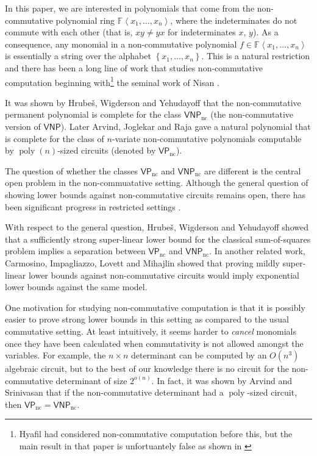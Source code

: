 \documentclass[10pt,a4paper]{article}
\def\Hrubes{Hrube{\v{s}}}
\def\Field{\mathbb{F}}
\let\F\Field
\def\poly{\operatorname{poly}}
\def\set#1{\left\{ #1 \right\}}
\def\inangle#1{\left\langle #1 \right\rangle}
\def\VNP{\mathsf{VNP}}
\def\ncVP{\mathsf{VP}_{\text{nc}}}
\def\ncVNP{\mathsf{VNP}_{\text{nc}}}
\begin{document}
In this paper, we are interested in polynomials that come from the non-commutative polynomial ring $\F \inangle{x_1, \ldots, x_n}$, where the indeterminates do not commute with each other (that is, $xy \neq yx$ for indeterminates $x$, $y$). 
As a consequence, any monomial in a non-commutative polynomial $f \in \F \inangle{x_1, \ldots, x_n}$ is essentially a string over the alphabet $\set{x_1, \ldots, x_n}$. 
This is a natural restriction and there has been a long line of work that studies non-commutative computation beginning with\footnote{Hyafil \cite{H77} had considered non-commutative computation before this, but the main result in that paper is unfortuantely false as shown in \cite{N91}} the seminal work of Nisan \cite{N91}.

It was shown by \Hrubes, Wigderson and Yehudayoff \cite{HWY10} that the non-commutative permanent polynomial is complete for the class $\ncVNP$ (the non-commutative version of $\VNP$).
Later Arvind, Joglekar and Raja \cite{AJR16} gave a natural polynomial that is complete for the class of $n$-variate non-commutative polynomials computable by $\poly(n)$-sized circuits (denoted by $\ncVP$). 

The question of whether the classes $\ncVP$ and $\ncVNP$ are different is the central open problem in the non-commuatative setting. 
Although the general question of showing lower bounds against non-commutative circuits remains open, there has been significant progress in restricted settings \cite{LMS16,LMP19,LLS19,ST18,FLOS20}.

With respect to the general question, \Hrubes, Wigderson and Yehudayoff \cite{HWY11} showed that a sufficiently strong super-linear lower bound for the classical sum-of-squares problem implies a separation between $\ncVP$ and $\ncVNP$.
In another related work, Carmosino, Impagliazzo, Lovett and Mihajlin \cite{CILM18} showed that proving mildly super-linear lower bounds against non-commutative circuits would imply exponential lower bounds against the same model.

One motivation for studying non-commutative computation is that it is possibly easier to prove strong lower bounds in this setting as compared to the usual commutative setting.
At least intuitively, it seems harder to \emph{cancel} monomials once they have been calculated when commutativity is not allowed amongst the variables. 
For example, the $n \times n$ determinant can be computed by an $O(n^3)$ algebraic circuit, but to the best of our knowledge there is no circuit for the non-commutative determinant of size $2^{o(n)}$. 
In fact, it was shown by Arvind and Srinivasan \cite{AS18} that if the non-commutative determinant had a $\poly$-sized circuit, then $\ncVP = \ncVNP$.
\end{document}
